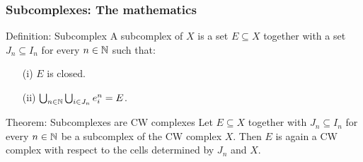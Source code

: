\documentclass{beamer}
\begin{document}
\begin{frame}
\frametitle{Subcomplexes: The mathematics}
\begin{block}{Definition: Subcomplex}
  A subcomplex of $X$ is a set $E \subseteq X$ together with a set $J_n \subseteq I_n$ for every $n \in \bN$ such that:
    \begin{enumerate}
        \item[(i)] $E$ is closed.
        \item[(ii)] $\bigcup_{n \in \bN} \bigcup_{i \in J_n} \openCell{n}{i} = E$.
    \end{enumerate}
\end{block}
\begin{block}{Theorem: Subcomplexes are CW complexes}
  Let $E \subseteq X$ together with $J_n \subseteq I_n$ for every $n \in \bN$ be a subcomplex of the CW complex $X$. 
  Then $E$ is again a CW complex with respect to the cells determined by $J_n$ and $X$.
\end{block}

\end{frame}
\end{document}
